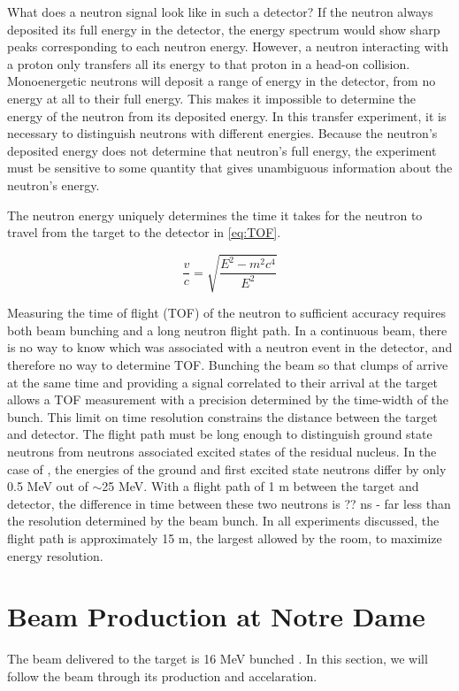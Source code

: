 What does a neutron signal look like in such a detector?  If the neutron always deposited its full energy in the detector, the energy spectrum would show sharp peaks corresponding to each neutron energy.  However, a neutron interacting with a proton only transfers all its energy to that proton in a head-on collision.  Monoenergetic neutrons will deposit a range of energy in the detector, from no energy at all to their full energy.  This makes it impossible to determine the energy of the neutron from its deposited energy.  In this transfer experiment, it is necessary to distinguish neutrons with different energies.  Because the neutron's deposited energy does not determine that neutron's full energy, the experiment must be sensitive to some quantity that gives unambiguous information about the neutron's energy.


The neutron energy uniquely determines the time it takes for the neutron to travel from the target to the detector in \eq \ref{eq:TOF}.  

\begin{equation}
\frac{v}{c} = \sqrt{\frac{E^2 - m^2c^4}{E^2}}
\label{eq:TOF}
\end{equation}

Measuring the time of flight (TOF) of the neutron to sufficient accuracy requires both beam bunching and a long neutron flight path.  In a continuous beam, there is no way to know which  was associated with a neutron event in the detector, and therefore no way to determine TOF.  Bunching the beam so that clumps of  arrive at the same time and providing a signal correlated to their arrival at the target allows a TOF measurement with a precision determined by the time-width of the bunch.  This limit on time resolution constrains the distance between the target and detector.  The flight path must be long enough to distinguish ground state neutrons from neutrons associated excited states of the residual nucleus.  In the case of ,  the energies of the ground and first excited state neutrons differ by only 0.5 MeV out of $\sim$25 MeV.  With a flight path of 1 m between the target and detector, the difference in time between these two neutrons is ?? ns - far less than the resolution determined by the beam bunch.  In all experiments discussed, the flight path is approximately 15 m, the largest allowed by the room, to maximize energy resolution.  

\section{Beam Production at Notre Dame}
The beam delivered to the target is 16 MeV bunched .  In this section, we will follow the beam through its production and accelaration.

